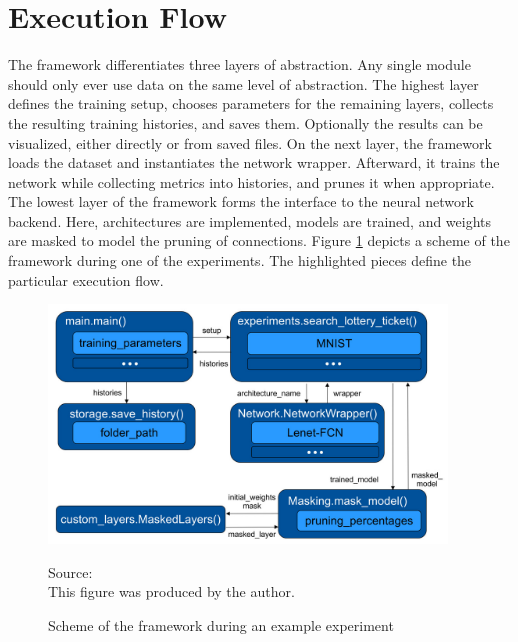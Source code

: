 
\section{Execution Flow}
The framework differentiates three layers of abstraction. Any single module should only ever use data on the same level of abstraction.
The highest layer defines the training setup, chooses parameters for the remaining layers, collects the resulting training histories, and saves them. Optionally the results can be visualized, either directly or from saved files. 
On the next layer, the framework loads the dataset and instantiates the network wrapper. Afterward, it trains the network while collecting metrics into histories, and prunes it when appropriate.
The lowest layer of the framework forms the interface to the neural network backend. Here, architectures are implemented, models are trained, and weights are masked to model the pruning of connections.
Figure \ref{fig:Example Control Flow} depicts a scheme of the framework during one of the experiments. The highlighted pieces define the particular execution flow.
\begin{figure}
	\centering
	\includegraphics[width=400px]{gfx/5-Implementation/control_flow.jpg}
	\caption{Scheme of the framework during an example experiment}
	\label{fig:Example Control Flow}
	\vspace{7pt}
	\footnotesize{
		Source:\\
		This figure was produced by the author.
	}
\end{figure}


